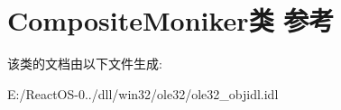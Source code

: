 \hypertarget{class_composite_moniker}{}\section{Composite\+Moniker类 参考}
\label{class_composite_moniker}


该类的文档由以下文件生成\+:\begin{DoxyCompactItemize}
\item 
E\+:/\+React\+O\+S-\/0../dll/win32/ole32/ole32\+\_\+objidl.\+idl\end{DoxyCompactItemize}
